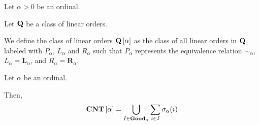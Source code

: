 \begin{definition}
  Let $\alpha > 0$ be an ordinal.

  Let $\mathbf{Q}$ be a class of linear orders.

  We define the class of linear orders
  $\mathbf{Q} \left[ {\alpha} \right]$ as the class of all linear orders in $\mathbf{Q}$,
  labeled with $P_\alpha$, $L_\alpha$ and $R_\alpha$
  such that $P_\alpha$ represents the equivalence relation $\sim_{\alpha}$,
  $L_\alpha = \mathbf{L}_{\alpha}$, and $R_\alpha = \mathbf{R}_{\alpha}$.
\end{definition}

\begin{lemma}{\label{cnt-decomposition-single-ordinal}}
  Let $\alpha$ be an ordinal.

  Then,
  \[
    \mathbf{CNT} \left[ {\alpha} \right] = \bigcup_{I \in \mathbf{Good}_{\alpha}} \sum_{i \in I} \sigma_\alpha(i)
  \]
\end{lemma}

